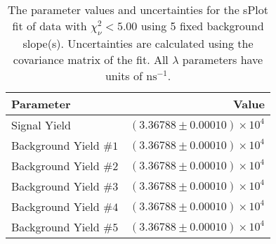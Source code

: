 
\begin{table}
    \begin{center}
        \begin{tabular}{lr}\toprule
            Parameter & Value \\\midrule
            Signal Yield & $(3.36788 \pm 0.00010) \times 10^{4}$ \\
            Background Yield $\#1$ & $(3.36788 \pm 0.00010) \times 10^{4}$ \\
            Background Yield $\#2$ & $(3.36788 \pm 0.00010) \times 10^{4}$ \\
            Background Yield $\#3$ & $(3.36788 \pm 0.00010) \times 10^{4}$ \\
            Background Yield $\#4$ & $(3.36788 \pm 0.00010) \times 10^{4}$ \\
            Background Yield $\#5$ & $(3.36788 \pm 0.00010) \times 10^{4}$ \\\bottomrule
        \end{tabular}
        \caption{The parameter values and uncertainties for the sPlot fit of data with $\chi^2_\nu < 5.00$ using 5 fixed background slope(s). Uncertainties are calculated using the covariance matrix of the fit. All $\lambda$ parameters have units of $\si{\nano\second}^{-1}$.}
    \end{center}
\end{table}
